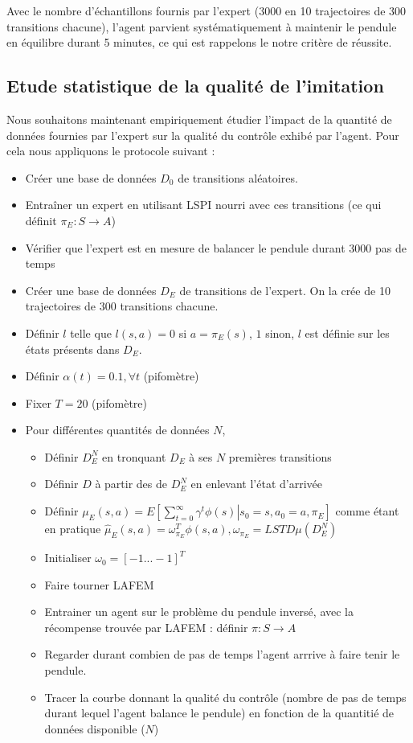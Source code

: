 \documentclass[publibook-draft]{CAp2012}
\begin{document}
Avec le nombre d'échantillons fournis par l'expert (3000 en 10 trajectoires de 300 transitions chacune), l'agent parvient systématiquement à maintenir le pendule en équilibre durant 5 minutes, ce qui est rappelons le notre critère de réussite.

\subsection{Etude statistique de la qualité de l'imitation}
Nous souhaitons maintenant empiriquement étudier l'impact de la quantité de données fournies par l'expert sur la qualité du contrôle exhibé par l'agent. Pour cela nous appliquons le protocole suivant :
\begin{itemize}
 \item Créer une base de données $D_0$ de transitions aléatoires.
 \item Entraîner un expert en utilisant LSPI nourri avec ces transitions (ce qui définit $\pi_E : S\rightarrow A$)
 \item Vérifier que l'expert est en mesure de balancer le pendule durant 3000 pas de temps
 \item Créer une base de données $D_E$ de transitions de l'expert. On la crée de 10 trajectoires de 300 transitions chacune.
 \item Définir $l$ telle que $l(s,a) = 0$ si $a=\pi_E(s)$, $1$ sinon, $l$ est définie sur les états présents dans $D_E$.
 \item Définir $\alpha(t) = 0.1,\forall t$ (pifomètre)
 \item Fixer $T=20$ (pifomètre)
 \item Pour différentes quantités de données $N$,
\begin{itemize}
   \item Définir $D_E^N$ en tronquant $D_E$ à ses $N$ premières transitions
   \item Définir $D$ à partir des de $D_E^N$ en enlevant l'état d'arrivée
   \item Définir $\mu_E(s,a) = E\left.\left[\sum\limits_{t=0}^\infty \gamma^t \phi(s)\right|s_0 = s, a_0 = a, \pi_E\right]$ comme étant en pratique $\hat\mu_E(s,a) =  \omega^T_{\pi_E}\phi(s,a), \omega_{\pi_E} = LSTD\mu(D_E^N)$
   \item Initialiser $\omega_0 = [-1...-1]^T$
   \item Faire tourner LAFEM
   \item Entrainer un agent sur le problème du pendule inversé, avec la récompense trouvée par LAFEM : définir $\pi : S\rightarrow A$
   \item Regarder durant combien de pas de temps l'agent arrrive à faire tenir le pendule.
   \item Tracer la courbe donnant la qualité du contrôle (nombre de pas de temps durant lequel l'agent balance le pendule) en fonction de la quantitié de données disponible ($N$)
\end{itemize}
\end{itemize}
\end{document}
